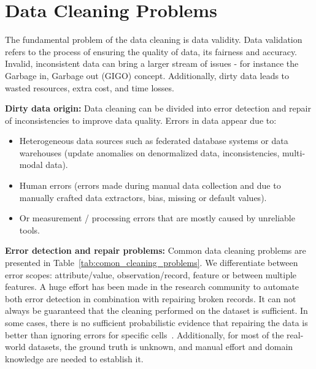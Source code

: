 \section{Data Cleaning Problems}
\label{sec:data_cleaning_problems}

The fundamental problem of the data cleaning is data validity.
Data validation refers to the process of ensuring the quality of data, its fairness and accuracy. 
Invalid, inconsistent data can bring a larger stream of issues - for instance the Garbage in, Garbage out (GIGO) concept.
Additionally, dirty data leads to wasted resources, extra cost, and time losses.

\textbf{Dirty data origin:} 
Data cleaning can be divided into error detection and repair of inconsistencies to improve data quality.
Errors in data appear due to:

\begin{itemize}
    \item Heterogeneous data sources such as federated database systems or
    data warehouses (update anomalies on denormalized data, inconsistencies, multi-modal data).
    \item Human errors (errors made during manual data collection and due to manually crafted data extractors, bias, missing or default values).
    \item Or measurement / processing errors that are mostly caused by unreliable tools.
\end{itemize}

\textbf{Error detection and repair problems:}
Common data cleaning problems are presented in Table~\ref{tab:comon_cleaning_problems}.
We differentiate between error scopes: attribute/value, observation/record, feature or between multiple features. 
A huge effort has been made in the research community to automate both error detection in combination with  repairing broken records. 
It can not always be guaranteed that the cleaning performed on the dataset is sufficient.
In some cases, there is no sufficient probabilistic evidence that repairing the data is better than ignoring errors for specific cells~\cite{RekatsinasCIR2017}. 
Additionally, for most of the real-world datasets, the ground truth is unknown, and manual effort and domain knowledge are needed to establish it.

